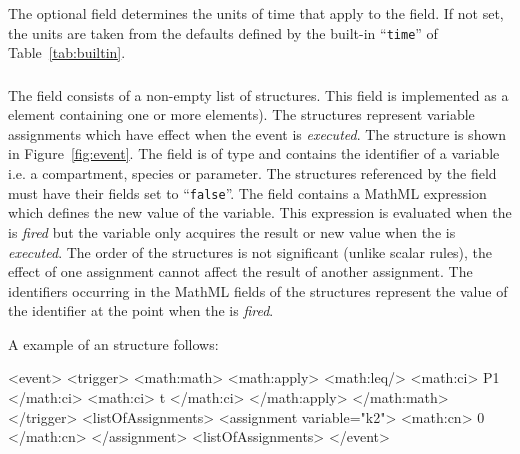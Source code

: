 \documentclass[10pt,twocolumntoc]{cekarticle}
\newcommand{\vref}[1]{\ref{#1}}
\begin{document}
\subsubsection{}
The optional field  determines the units of time
that apply to the  field. If not set, the units are
taken from the defaults defined by the built-in ``\texttt{time}''
of Table~\vref{tab:builtin}.

\subsubsection{}
The  field consists of a non-empty list of
 structures.  This field is implemented as a
 element containing one or more
 elements).  The 
structures represent variable assignments which have effect when
the event is \emph{executed}. The  structure is
shown in Figure~\ref{fig:event}. The  field is of
type  and contains the identifier of a variable i.e. a
compartment, species or parameter.  The structures referenced by
the  field must have their 
fields set to ``\texttt{false}''.  The  field
contains a MathML expression which defines the new value of the
variable.  This expression is evaluated when the  is
\emph{fired} but the variable only acquires the result or new
value when the  is \emph{executed}.  The order of the
 structures is not significant (unlike
scalar rules), the effect of one assignment cannot affect the
result of another assignment.  The identifiers occurring in the
MathML  fields of the 
structures represent the value of the identifier at the point when
the  is \emph{fired}.

A example of an  structure follows:

\begin{example}
<event>
    <trigger>
        <math:math>
            <math:apply>
                <math:leq/>
                <math:ci> P1 </math:ci>
                <math:ci> t </math:ci>
            </math:apply>
        </math:math>
    </trigger>
    <listOfAssignments>
        <assignment variable="k2">
            <math:cn> 0 </math:cn>
        </assignment>
    <listOfAssignments>
</event>
\end{example}
\end{document}
